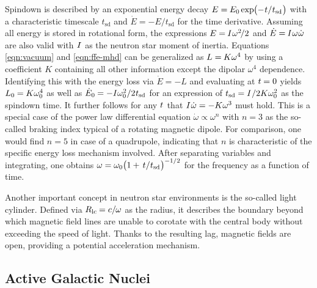 Spindown is described by an exponential energy decay $E = \kern-0.3pt E_0 \kern-0.2pt \exp \kern-2.0pt
\smash{\bigl( - \kern+0.5pt t \kern+0.1pt / \kern+0.2pt t_\text{sd} \kern+0.5pt \bigr)}$ with a characteristic timescale
$t_\text{sd}$ and $\dot{E} = - E / t_\text{sd}$ for the time derivative. Assuming all energy is stored in
rotational form, the expressions $E = \kern-0.5pt I \kern+0.5pt \omega^2 \kern-1.5pt / 2$ and
$\dot{E} = \kern-0.5pt I \kern+0.5pt \omega \kern+0.5pt \dot{\omega}$ are also valid with $I \kern+0.5pt$ as the neutron star
moment of inertia. Equations \eqref{eqn:vacuum} and \eqref{eqn:ffe-mhd} can be generalized as $L = \kern-0.5pt K \omega^4$ by
using a coefficient $K$ containing all other information except the dipolar $\omega^4$ dependence. Identifying this with the energy
loss via $\dot{E} = -L$ and evaluating at $t \kern-0.3pt= 0$ yields $L_0 \kern-0.3pt = \kern-0.2pt K \omega_0^4$ as well as
$\dot{E}_0 \kern-0.3pt = -I \omega_0^2 / 2 \kern+0.4pt t_\text{sd}$ for an expression of
$t_\text{sd} = I \kern+0.5pt / 2K\omega_0^2$ as the spindown time. It further follows for any $t \kern+0.5pt$ that
$I \kern+0.5pt \dot{\omega} = -K \omega^3$ must hold. This is a special case of the power law differential equation
$\dot{\omega} \propto \omega^n$ with $n = 3$ as the so-called braking index typical of a rotating magnetic dipole. 
For comparison, one would find $n = 5$ in case of a quadrupole, indicating that $n$ is characteristic of the specific
energy loss mechanism involved. After separating variables and integrating, one obtains
$\omega = \omega_0 \smash{\bigl( 1 + \kern+1.5pt t \kern+0.1pt / \kern+0.2pt t_\text{sd} \kern+0.5pt \bigr)^{-1/2}}$
for the frequency as a function of time.

Another important concept in neutron star environments is the so-called light cylinder. Defined via
$R_\text{lc} \kern-0.6pt = c / \kern-0.4pt \omega$ as the radius, it describes the boundary beyond which magnetic field lines
are unable to corotate with the central body without exceeding the speed of light. Thanks to the resulting lag, magnetic fields
are open, providing a potential acceleration mechanism.



\subsection{Active Galactic Nuclei}
\label{sub:nuclei}

\cite{Murase_2023} \cite{Visser_2008} \cite{Abramowicz_2013} \cite{Blandford_2019} \cite{Beckmann_2013}



